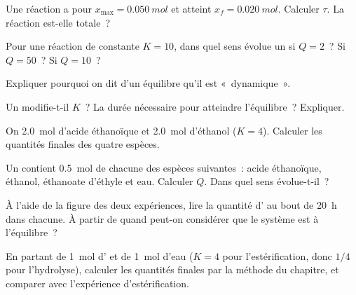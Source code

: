 \begin{exercise}[$\star$]\label{exo:g12:equilibrium:2}
Une réaction a pour $x_{\max} = \qty{0.050}{mol}$ et atteint
$x_f = \qty{0.020}{mol}$. Calculer $\tau$. La réaction est-elle
totale~?
\end{exercise}

\begin{exercise}[$\star$]\label{exo:g12:equilibrium:3}
Pour une réaction de constante $K = 10$, dans quel sens évolue un
 si
$Q = 2$~? Si $Q = 50$~? Si $Q = 10$~?
\end{exercise}

\begin{exercise}[$\star$]\label{exo:g12:equilibrium:4}
Expliquer pourquoi on dit d'un équilibre qu'il est «~dynamique~».
\end{exercise}

\begin{exercise}[$\star$]\label{exo:g12:equilibrium:5}
Un  modifie-t-il $K$~? La durée nécessaire pour atteindre
l'équilibre~? Expliquer.
\end{exercise}

\begin{exercise}[$\star\star$]\label{exo:g12:equilibrium:6}
On  \qty{2.0}{mol} d'acide éthanoïque et \qty{2.0}{mol}
d'éthanol ($K = 4$). Calculer les quantités finales des quatre espèces.
\end{exercise}

\begin{exercise}[$\star\star$]\label{exo:g12:equilibrium:7}
Un  contient \qty{0.5}{mol} de chacune des espèces suivantes~:
acide éthanoïque, éthanol, éthanoate d'éthyle et eau. Calculer $Q$. Dans
quel sens évolue-t-il~?
\end{exercise}

\begin{exercise}[$\star\star$]\label{exo:g12:equilibrium:8}
À l'aide de la figure des deux expériences, lire la quantité d'
au bout de
\qty{20}{h} dans chacune. À partir de quand peut-on considérer que le
système est à l'équilibre~?
\end{exercise}

\begin{exercise}[$\star\star$]\label{exo:g12:equilibrium:9}
En partant de \qty{1}{mol} d' et de \qty{1}{mol} d'eau ($K = 4$
pour l'estérification, donc $1/4$ pour l'hydrolyse), calculer les
quantités finales par la méthode du chapitre, et comparer avec
l'expérience d'estérification.
\end{exercise}

